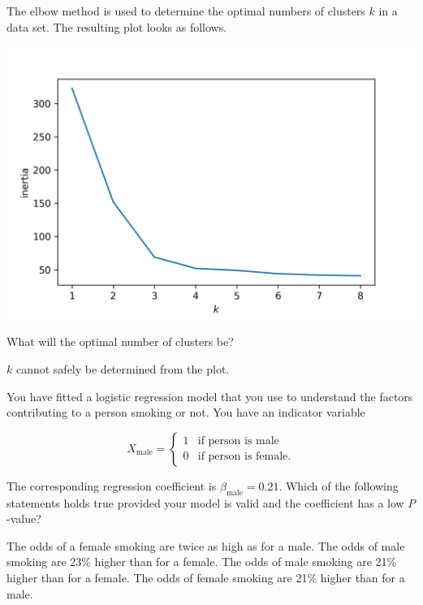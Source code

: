 \documentclass[a4paper,11pt,english,plainsub]{uioexam}
\begin{document}

The elbow method is used to determine the optimal numbers of clusters
$k$ in a data set. The resulting plot looks as follows.

\includegraphics[width=\textwidth]{k-means}

What will the optimal number of clusters be?

\begin{choicelist}[]
  \choice $k$ cannot safely be determined from the plot.
\end{choicelist}


You have fitted a logistic regression model that you use to understand
the factors contributing to a person smoking or not. You have an
indicator variable

\[
  X_{\mathrm{male}} = 
  \begin{cases}
    1 & \mbox{if person is male}\\
    0 & \mbox{if person is female}.
  \end{cases}
\]

The corresponding regression coefficient is $\beta_{\mathrm{male}} =
0.21$. Which of the following statements holds true provided your
model is valid and the coefficient has a low $P$-value?

\begin{choicelist}[]
  \choice The odds of a female smoking are twice as high as for a male.
  \choice The odds of male smoking are 23\% higher than for a female.
  \choice The odds of male smoking are 21\% higher than for a female.
  \choice The odds of female smoking are 21\% higher than for a male.
\end{choicelist}
\end{document}
